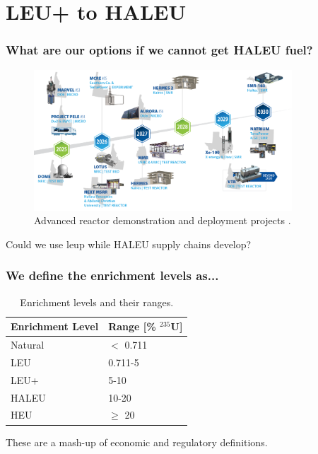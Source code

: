 \documentclass[9pt]{beamer}
\begin{document}
  \section{LEU+ to HALEU}
  \begin{frame}
    \frametitle{What are our options if we cannot get HALEU fuel?}
    \begin{figure}
        \centering
        \includegraphics[width=0.86\textwidth]{../images/reactor_timeline.png}
        \caption{Advanced reactor demonstration and deployment projects \cite{inl_reactor_timeline}.}
    \end{figure}
    Could we use \gls{leup} while HALEU supply chains develop?
  \end{frame}

  \begin{frame}
    \frametitle{We define the enrichment levels as...}
    \begin{table}[H]
        \centering
        \caption{Enrichment levels and their ranges.}
        \label{tab:enrichment_levels}
        \begin{tabular}{l l}
           \hline
           \textbf{Enrichment Level} & \textbf{Range [\%  $^{235}$U]} \\
           \hline
           Natural & $<$ 0.711 \\
           LEU & 0.711-5 \\
           LEU+ & 5-10 \\
           HALEU & 10-20 \\
           HEU & $\geq$ 20  \\
           \hline
        \end{tabular}
     \end{table}
     \vspace{8pt}
     These are a mash-up of economic and regulatory definitions.
  \end{frame}
\end{document}

